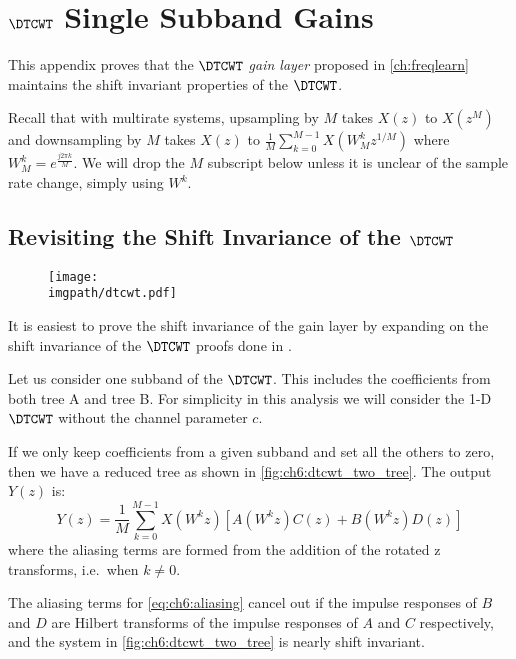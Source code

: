 \chapter{$\DTCWT$ Single Subband Gains}\label{app:ch6:dtcwt}
This appendix proves that the $\DTCWT$ \emph{gain layer} proposed in
\autoref{ch:freqlearn} maintains the shift invariant properties of the
$\DTCWT$.

Recall that with multirate systems, upsampling by $M$ takes $X(z)$ to
$X(z^M)$ and downsampling by $M$ takes $X(z)$ to $\frac{1}{M}\sum_{k=0}^{M-1} X(W_M^k
z^{1/M})$ where $W_M^k = e^{\frac{j2\pi k}{M}}$. We will drop the $M$ subscript
below unless it is unclear of the sample rate change, simply using $W^k$.


\section{Revisiting the Shift Invariance of the $\DTCWT$}
\begin{figure}[t]
  \centering
  \texttt{[image: \\imgpath/dtcwt.pdf]}
  \label{fig:ch6:dtcwt_two_tree}
\end{figure}
It is easiest to prove the shift invariance of the gain layer by expanding on
the shift invariance of the $\DTCWT$ proofs done in
\cite{kingsbury_complex_2001}.

Let us consider one subband of the $\DTCWT$. This includes the coefficients from
both tree A and tree B. For simplicity in this analysis we will consider the 1-D
$\DTCWT$ without the channel parameter $c$. 

If we only keep coefficients from a given
subband and set all the others to zero, then we have a reduced tree as shown in
\autoref{fig:ch6:dtcwt_two_tree}. The output $Y(z)$ is:
%
\begin{equation}
  Y(z) = \frac{1}{M} \sum_{k=0}^{M-1}X(W^k z) \left[A(W^k z)C(z) + B(W^k z)D(z)\right]
  \label{eq:ch6:aliasing}
\end{equation}
%
where the aliasing terms are formed from the addition of the rotated z
transforms, i.e.\ when $k \neq 0$.

\begin{theorem} \label{thm:ch6:shiftinv}
  The aliasing terms for \eqref{eq:ch6:aliasing} cancel out if the impulse
  responses of $B$ and $D$ are Hilbert transforms of the impulse responses of
  $A$ and $C$ respectively, and the system in \autoref{fig:ch6:dtcwt_two_tree}
  is nearly shift invariant.
\end{theorem}


